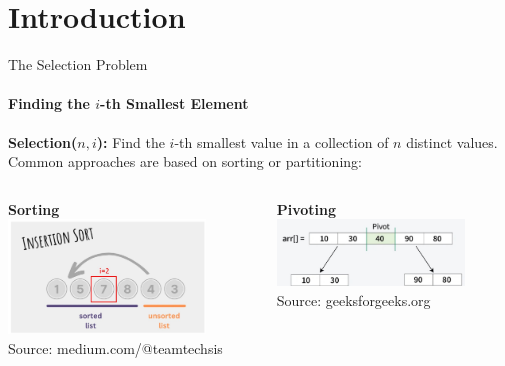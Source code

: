 
\section{Introduction}


\begin{frame}{The Selection Problem}
  \framesubtitle{Finding the $i$-th Smallest Element}
  \textbf{Selection($n,i$):} Find the $i$-th smallest value in a collection of $n$ distinct values.
  \vfill
  \centering
  Common approaches are based on sorting or partitioning:
  \begin{columns}[T]
    \begin{column}{0.45\textwidth}
      \centering
      \textbf{Sorting}\\
      \includegraphics[width=0.8\textwidth, trim={0 0 0 3.5cm}, clip]{figures/Insertion_sort.jpg}\\
      \tiny{Source: medium.com/@teamtechsis}
    \end{column}
    \begin{column}{0.45\textwidth}
      \centering
      \textbf{Pivoting}\\
      \includegraphics[width=0.8\textwidth]{figures/Pivot.jpg}\\
      \tiny{Source: geeksforgeeks.org}
    \end{column}
  \end{columns}


\end{frame}
